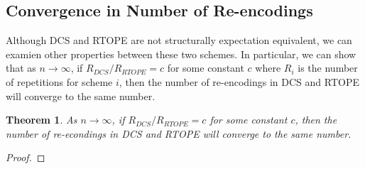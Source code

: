 \documentclass[12pt]{article}
\newtheorem{theorem}{Theorem}[section]
\begin{document}
  \subsection{Convergence in Number of Re-encodings}

  Although DCS and RTOPE are not structurally expectation equivalent, we can examien other properties between these two schemes. In particular, we can show that as $n \to \infty$, if $R_{DCS} / R_{RTOPE} = c$ for some constant $c$ where $R_{i}$ is the number of repetitions for scheme $i$, then the number of re-encodings in DCS and RTOPE will converge to the same number.

  \begin{theorem}
    As $n \to \infty$, if $R_{DCS} / R_{RTOPE} = c$ for some constant $c$, then the number of re-econdings in DCS and RTOPE will converge to the same number.
  \end{theorem}
  \begin{proof}
  \end{proof}

  
\end{document}
